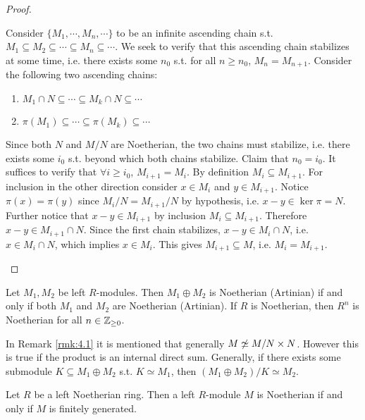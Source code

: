 \documentclass{article}
\begin{document}
\begin{proof}
\begin{itemize}
        Consider $\{M_1, \cdots, M_n, \cdots\}$ to be an infinite ascending chain s.t. $M_1\subseteq M_2\subseteq \cdots \subseteq M_n \subseteq \cdots$. We seek to verify that this ascending chain stabilizes at some time, i.e. there exists some $n_0$ s.t. for all $n \geq n_0$, $M_n = M_{n+1}$. Consider the following two ascending chains:
        \begin{enumerate}[label=(\arabic*)]
            \item $M_1\cap N \subseteq \cdots \subseteq M_k\cap N \subseteq \cdots $
            \item $\pi(M_1)\subseteq \cdots \subseteq \pi(M_k) \subseteq \cdots$
        \end{enumerate}
        Since both $N$ and $M/N$ are Noetherian, the two chains must stabilize, i.e. there exists some $i_0$ s.t. beyond which both chains stabilize. Claim that $n_0 = i_0$. It suffices to verify that $\forall i \geq i_0$, $M_{i+1} = M_i$. By definition $M_i\subseteq M_{i+1}$. For inclusion in the other direction consider $x\in M_i$ and $y\in M_{i+1}$. Notice $\pi(x) = \pi(y)$ since $M_i/N = M_{i+1}/N$ by hypothesis, i.e. $x - y \in \ker\pi = N$. Further notice that $x - y \in M_{i+1}$ by inclusion $M_i \subseteq M_{i+1}$. Therefore $x - y \in M_{i+1} \cap N$. Since the first chain stabilizes, $x - y \in M_i \cap N$, i.e. $x \in M_i\cap N$, which implies $x\in M_i$. This gives $M_{i+1} \subseteq M$, i.e. $M_i = M_{i+1}$.
    \end{itemize}
\end{proof}

\begin{corollary}
    Let $M_1, M_2$ be left $R$-modules. Then $M_1\oplus M_2$ is Noetherian (Artinian) if and only if both $M_1$ and $M_2$ are Noetherian (Artinian). If $R$ is Noetherian, then $R^n$ is Noetherian for all $n\in\mathbb{Z}_{\geq 0}$.
\end{corollary}

\begin{remark}
    In Remark \ref{rmk:4.1} it is mentioned that generally $M \centernot\simeq M/N \times N$. However this is true if the product is an internal direct sum. Generally, if there exists some submodule $K \subseteq M_1 \oplus M_2$ s.t. $K \simeq M_1$, then $(M_1 \oplus M_2)/K \simeq M_2$. 
\end{remark}

\begin{proposition}\label{prop:Noeth modules on Noeth rings}
    Let $R$ be a left Noetherian ring. Then a left $R$-module $M$ is Noetherian if and only if $M$ is finitely generated.
\end{proposition}
\end{document}
